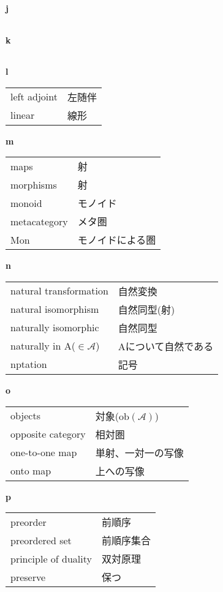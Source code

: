 \documentclass[dvipdfmx]{jsarticle}
\begin{document}
\textbf{j}

  \begin{tabular}{ll}
  \end{tabular}

\textbf{k}

  \begin{tabular}{ll}
  \end{tabular}

\textbf{l}

  \begin{tabular}{ll}
    left adjoint & 左随伴 \\
    linear & 線形 \\
  \end{tabular}

\textbf{m}

  \begin{tabular}{ll}
    maps & 射 \\
    morphisms & 射 \\
    monoid & モノイド \\
    metacategory & メタ圏 \\
    Mon & モノイドによる圏 \\
  \end{tabular}

\textbf{n}

  \begin{tabular}{ll}
    natural transformation & 自然変換 \\
    natural isomorphism & 自然同型(射) \\
    naturally isomorphic & 自然同型 \\
    naturally in A($\in \mathscr{A}$) & Aについて自然である \\
    nptation & 記号 \\
  \end{tabular}

\textbf{o}

  \begin{tabular}{ll}
    objects & 対象($\mathrm{ob}(\mathscr{A})$) \\
    opposite category & 相対圏 \\
    one-to-one map & 単射、一対一の写像 \\
    onto map & 上への写像 \\
  \end{tabular}

\textbf{p}

  \begin{tabular}{ll}
    preorder & 前順序 \\
    preordered set & 前順序集合 \\
    principle of duality & 双対原理 \\
    preserve & 保つ \\
  \end{tabular}
\end{document}
